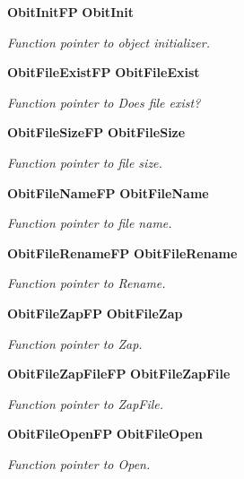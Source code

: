\begin{CompactItemize}
{\bf Obit\-Init\-FP} {\bf Obit\-Init}
\begin{CompactList}\small\item\em Function pointer to object initializer. \item\end{CompactList}\item 
{\bf Obit\-File\-Exist\-FP} {\bf Obit\-File\-Exist}
\begin{CompactList}\small\item\em Function pointer to Does file exist? \item\end{CompactList}\item 
{\bf Obit\-File\-Size\-FP} {\bf Obit\-File\-Size}
\begin{CompactList}\small\item\em Function pointer to file size. \item\end{CompactList}\item 
{\bf Obit\-File\-Name\-FP} {\bf Obit\-File\-Name}
\begin{CompactList}\small\item\em Function pointer to file name. \item\end{CompactList}\item 
{\bf Obit\-File\-Rename\-FP} {\bf Obit\-File\-Rename}
\begin{CompactList}\small\item\em Function pointer to Rename. \item\end{CompactList}\item 
{\bf Obit\-File\-Zap\-FP} {\bf Obit\-File\-Zap}
\begin{CompactList}\small\item\em Function pointer to Zap. \item\end{CompactList}\item 
{\bf Obit\-File\-Zap\-File\-FP} {\bf Obit\-File\-Zap\-File}
\begin{CompactList}\small\item\em Function pointer to Zap\-File. \item\end{CompactList}\item 
{\bf Obit\-File\-Open\-FP} {\bf Obit\-File\-Open}
\begin{CompactList}\small\item\em Function pointer to Open. \item\end{CompactList}\item 

\end{CompactItemize}
